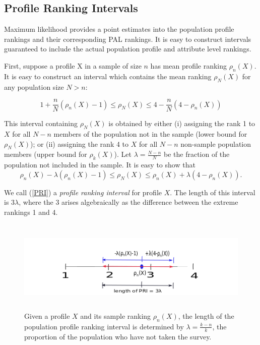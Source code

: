 \documentclass[a4paper, 12pt]{article}
\begin{document}
\subsection{Profile Ranking Intervals}

Maximum likelihood  provides a point estimates into the population profile rankings and their corresponding PAL rankings.  It is easy to construct intervals guaranteed to include the actual population  profile and attribute level rankings.


First, suppose a profile X in a sample of size $n$ has mean profile ranking $\rho_n(X)$.  It is easy to construct an interval which contains the mean ranking $\rho_N(X)$ for any population size $N>n$:

\begin{equation}
1+\frac{n}{N}(\rho_n(X)-1)\le \rho_N(X)  \le 4-\frac{n}{N}(4-\rho_n(X))
\label{eq6}
\end{equation}

{\flushleft This} interval containing $\rho_N(X) $ is obtained by either (i) assigning the  rank 1 to $X$ for all $N-n$ members of the population not in the sample (lower bound for $\rho_N(X)$); or (ii) assigning the rank 4 to $X$  for all $N-n$ non-sample population members (upper bound for $\rho_k(X)$). Let  $\lambda=\frac{N-n}{N}$ be the fraction of the population not included in the sample.  It is easy to show that
\begin{equation}
\rho_n(X)-\lambda(\rho_n(X)-1)\le \rho_N(X) \le \rho_n(X) + \lambda(4-\rho_n(X)).
\label{PRI}
\end{equation}

{\flushleft We} call (\ref{PRI}) a \emph{profile ranking interval} for profile $X$.  The length of this interval is 
  $3\lambda$, where the 3 arises algebraically as the difference between  the extreme rankings 1 and 4.

\begin{figure}[!htpb]
\centering
\includegraphics[width=6.5in, height=1.75in]{Confidence_Interval.png}
\caption{Given a profile $X$ and its sample ranking $\rho_n(X)$, the length of the population profile ranking interval  is determined by $\lambda=\frac{k-n}{k}$, the proportion of the population who have not taken the survey.}
\label{AL}
\end{figure}
\end{document}
